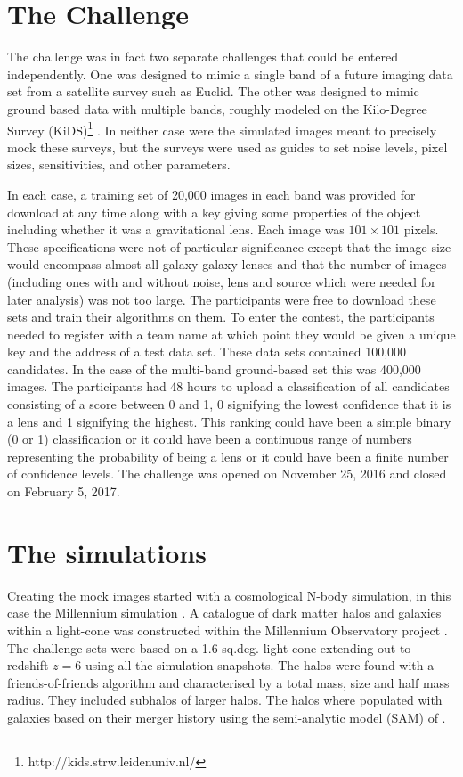 \documentclass{aa}
\begin{document}
\section{The Challenge}
\label{sec:challenge}

The challenge was in fact two separate challenges that could be entered independently.  One was designed to mimic a single band of a future imaging data set from a satellite survey such as Euclid.  The other was designed to mimic ground based data with multiple bands, roughly modeled on the Kilo-Degree Survey (KiDS)\footnote{http://kids.strw.leidenuniv.nl/} \citep{2013ExA....35...25D}. In neither case were the simulated images meant to precisely mock these surveys, but the surveys were used as guides to set noise levels, pixel sizes, sensitivities, and other parameters.

In each case, a training set of 20,000 images in each band was provided for download at any time along with a key giving some properties of the object including whether it was a gravitational lens.  Each image was $101\times101$ pixels.  These specifications were not of particular significance except that the image size would encompass almost all galaxy-galaxy lenses and that the number of images (including ones with and without noise, lens and source which were needed for later analysis) was not too large.
The participants were free to download these sets and train their algorithms on them.  To enter the contest, the participants needed to register with a team name at which point they would be given a unique key and the address of a test data set.  These data sets contained 100,000 candidates.  In the case of the multi-band ground-based set this was 400,000 images. The participants had 48 hours to upload a classification of all candidates consisting of a score between 0 and 1, 0 signifying the lowest confidence that it is a lens and 1 signifying the highest.  This ranking could have been a simple binary (0 or 1) classification  or it could have been a continuous range of numbers representing the probability of being a lens or it could have been a finite number of confidence levels.  
The challenge was opened on November 25, 2016 and closed on February 5, 2017.

\section{The simulations}
\label{sec:simulation}

Creating the mock images started with a cosmological N-body simulation, in this case the Millennium simulation \citep{2009MNRAS.398.1150B}.   A catalogue of dark matter halos and galaxies  within a light-cone was constructed within the Millennium Observatory project \citep{2013MNRAS.428..778O}.   The challenge sets were based on a 1.6 sq.deg. light cone extending out to redshift $z=6$ using all the simulation snapshots.  The halos were found with a friends-of-friends algorithm and characterised by a total mass, size and half mass radius.  They included subhalos of larger halos.  The halos where populated with galaxies based on their merger history using the semi-analytic model  (SAM) of \cite{2011MNRAS.413..101G}.
\end{document}
